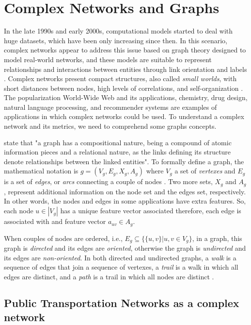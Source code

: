 \section{Complex Networks and Graphs}
In the late 1990s and early 2000s, computational models started to 
deal with huge datasets, which have been only increasing since then. 
In this scenario, complex networks appear to address this issue
based on graph theory designed to model real-world networks, and these models
are suitable to represent relationships and interactions 
between entities through link orientation and labels \cite{barabasiCN}.
Complex networks present compact structures, also called {\em small worlds},
with short distances between nodes, high levels of correlations, and self-organization
\cite{ferber2012}.
The popularization World-Wide Web and its applications, chemistry, drug 
design, natural language processing, and recommender
systems are examples of applications in which complex networks could be used.
To understand a complex network and its metrics, we need to comprehend 
some graphs concepts.

 state that "a graph has a compositional nature, being 
a compound of atomic information pieces and a relational nature, as the links
defining its structure denote relationships between the linked entities".
To formally define a graph, the mathematical notation is  \textit{$g = (V_g, E_g, X_g, A_g)$}
where $V_g$ a set of {\em vertexes} and $E_g$ is a set of {\em edges}, or {\em arcs} 
connecting a couple of nodes \cite{graph}. Two more sets, $X_g$ and $A_g$, represent additional information on the node set and the edges set, respectively. In other words, the nodes and edges in some applications have extra features. So, each node $u \in |V_g|$
has a unique feature vector associated therefore, each edge is associated with 
and feature vector $a_{uv} \in A_g$. 

When couples of nodes are ordered, i.e., 
$E_g \subseteq \{\{u,v \} | u,v \in V_g\}$, in a graph, this graph is {\em directed} and its 
edges are {\em oriented}, otherwise the graph is {\em undirected} and its edges 
are {\em non-oriented}. In both directed and undirected graphs, a {\em walk} is a sequence of 
edges that join a sequence of vertexes, a {\em trail} is a walk in which all edges are distinct,
and a {\em path} is a trail in which all nodes are distinct
\cite{williamsonlists}.

\subsection{Public Transportation Networks as a complex network}

